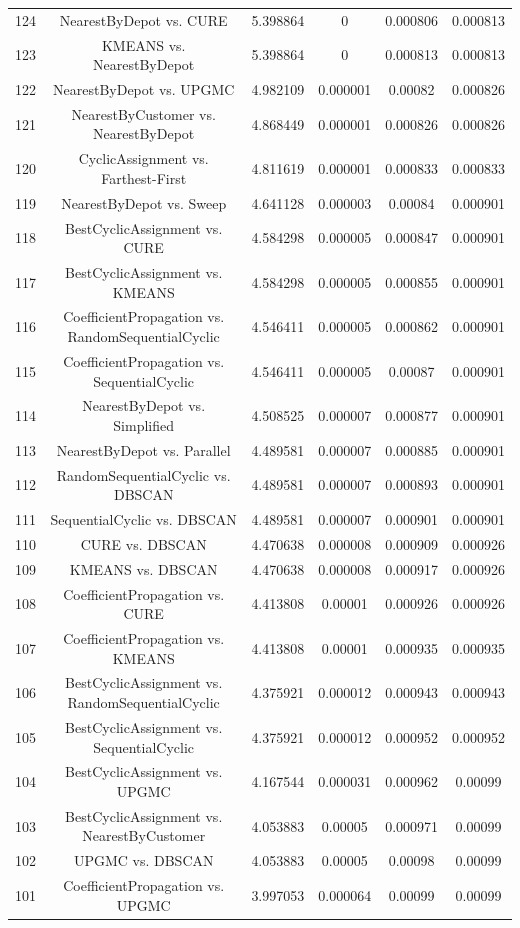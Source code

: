\documentclass[a4paper,10pt]{article}
\begin{document}
\begin{landscape}
\begin{table}[!htp]
\begin{tabular}{cccccc}
124&NearestByDepot vs. CURE&5.398864&0&0.000806&0.000813\\
123&KMEANS vs. NearestByDepot&5.398864&0&0.000813&0.000813\\
122&NearestByDepot vs. UPGMC&4.982109&0.000001&0.00082&0.000826\\
121&NearestByCustomer vs. NearestByDepot&4.868449&0.000001&0.000826&0.000826\\
120&CyclicAssignment vs. Farthest-First&4.811619&0.000001&0.000833&0.000833\\
119&NearestByDepot vs. Sweep&4.641128&0.000003&0.00084&0.000901\\
118&BestCyclicAssignment vs. CURE&4.584298&0.000005&0.000847&0.000901\\
117&BestCyclicAssignment vs. KMEANS&4.584298&0.000005&0.000855&0.000901\\
116&CoefficientPropagation vs. RandomSequentialCyclic&4.546411&0.000005&0.000862&0.000901\\
115&CoefficientPropagation vs. SequentialCyclic&4.546411&0.000005&0.00087&0.000901\\
114&NearestByDepot vs. Simplified&4.508525&0.000007&0.000877&0.000901\\
113&NearestByDepot vs. Parallel&4.489581&0.000007&0.000885&0.000901\\
112&RandomSequentialCyclic vs. DBSCAN&4.489581&0.000007&0.000893&0.000901\\
111&SequentialCyclic vs. DBSCAN&4.489581&0.000007&0.000901&0.000901\\
110&CURE vs. DBSCAN&4.470638&0.000008&0.000909&0.000926\\
109&KMEANS vs. DBSCAN&4.470638&0.000008&0.000917&0.000926\\
108&CoefficientPropagation vs. CURE&4.413808&0.00001&0.000926&0.000926\\
107&CoefficientPropagation vs. KMEANS&4.413808&0.00001&0.000935&0.000935\\
106&BestCyclicAssignment vs. RandomSequentialCyclic&4.375921&0.000012&0.000943&0.000943\\
105&BestCyclicAssignment vs. SequentialCyclic&4.375921&0.000012&0.000952&0.000952\\
104&BestCyclicAssignment vs. UPGMC&4.167544&0.000031&0.000962&0.00099\\
103&BestCyclicAssignment vs. NearestByCustomer&4.053883&0.00005&0.000971&0.00099\\
102&UPGMC vs. DBSCAN&4.053883&0.00005&0.00098&0.00099\\
101&CoefficientPropagation vs. UPGMC&3.997053&0.000064&0.00099&0.00099\\

\end{tabular}
\end{table}
\end{landscape}
\end{document}
